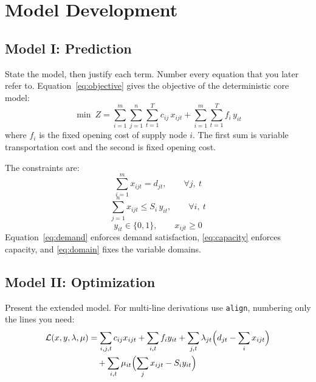 \documentclass[12pt]{article}
\begin{document}
\section{Model Development}
\label{sec:model}

\subsection{Model I: Prediction}

State the model, then justify each term. Number every equation that you later refer to.
Equation~\eqref{eq:objective} gives the objective of the deterministic core model:
\begin{equation}
  \min\ Z=\sum_{i=1}^{m}\sum_{j=1}^{n}\sum_{t=1}^{T} c_{ij}\,x_{ijt}
            +\sum_{i=1}^{m}\sum_{t=1}^{T} f_i\,y_{it}
  \label{eq:objective}
\end{equation}
where $f_i$ is the fixed opening cost of supply node $i$. The first sum is variable
transportation cost and the second is fixed opening cost.

The constraints are:
\begin{equation}
  \sum_{i=1}^{m} x_{ijt} = d_{jt}, \qquad \forall j,\ t
  \label{eq:demand}
\end{equation}
\begin{equation}
  \sum_{j=1}^{n} x_{ijt} \le S_i\,y_{it}, \qquad \forall i,\ t
  \label{eq:capacity}
\end{equation}
\begin{equation}
  y_{it}\in\{0,1\},\qquad x_{ijt}\ge 0
  \label{eq:domain}
\end{equation}
Equation~\eqref{eq:demand} enforces demand satisfaction, \eqref{eq:capacity} enforces
capacity, and \eqref{eq:domain} fixes the variable domains.

\subsection{Model II: Optimization}

Present the extended model. For multi-line derivations use \texttt{align}, numbering only
the lines you need:
\begin{align}
  \mathcal{L}(x,y,\lambda,\mu)
    &= \sum_{i,j,t} c_{ij}x_{ijt} + \sum_{i,t} f_i y_{it}
       + \sum_{j,t}\lambda_{jt}\Bigl(d_{jt}-\sum_i x_{ijt}\Bigr) \notag \\
    &\quad + \sum_{i,t}\mu_{it}\Bigl(\sum_j x_{ijt}-S_i y_{it}\Bigr)
  \label{eq:lagrange}
\end{align}
\end{document}
